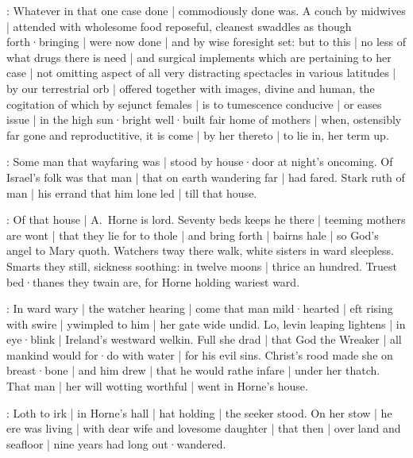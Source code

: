 :
Whatever in that one case done |
commodiously done was.
A couch by midwives |
attended with wholesome food reposeful,
cleanest swaddles as though forth·bringing |
were now done |
and by wise foresight set:
but to this |
no less of what drugs there is need |
and surgical implements which are pertaining to her case |
not omitting aspect of all very distracting spectacles in various latitudes |
by our terrestrial orb |
offered together with images,
divine and human,
the cogitation of which by sejunct females |
is to tumescence conducive |
or eases issue |
in the high sun·bright well·built fair home of mothers |
when,
ostensibly far gone and reproductitive,
it is come |
by her thereto |
to lie in,
her term up.



:
Some man that wayfaring was |
stood by house·door at night's oncoming.
Of Israel's folk was that man |
that on earth wandering far |
had fared.
Stark ruth of man |
his errand that him lone led |
till that house.


:
Of that house |
A.~Horne is lord.
Seventy beds keeps he there |
teeming mothers are wont |
that they lie for to thole |
and bring forth |
bairns hale |
so God's angel to Mary quoth.
Watchers tway there walk,
white sisters in ward sleepless.
Smarts they still,
sickness soothing:
in twelve moons |
thrice an hundred.
Truest bed·thanes they twain are,
for Horne holding wariest ward.


:
In ward wary |
the watcher hearing |
come that man mild·hearted |
eft rising with swire |
ywimpled to him |
her gate wide undid.
Lo,
levin leaping lightens |
in eye·blink |
Ireland's westward welkin.
Full she drad |
that God the Wreaker |
all mankind would for·do with water |
for his evil sins.
Christ's rood made she on breast·bone |
and him drew |
that he would rathe infare |
under her thatch.
That man |
her will wotting worthful |
went in Horne's house.



:
Loth to irk |
in Horne's hall |
hat holding |
the seeker stood.
On her stow |
he ere was living |
with dear wife and lovesome daughter |
that then |
over land and seafloor |
nine years had long out·wandered.

